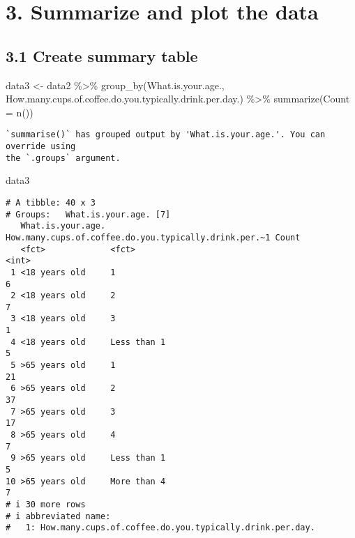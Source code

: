 \documentclass[
  letterpaper,
  DIV=11,
  numbers=noendperiod]{scrreprt}
\newenvironment{Shaded}{\begin{snugshade}}{\end{snugshade}}
\newcommand{\AttributeTok}[1]{\textcolor[rgb]{0.40,0.45,0.13}{#1}}
\newcommand{\FunctionTok}[1]{\textcolor[rgb]{0.28,0.35,0.67}{#1}}
\newcommand{\NormalTok}[1]{\textcolor[rgb]{0.00,0.23,0.31}{#1}}
\newcommand{\OtherTok}[1]{\textcolor[rgb]{0.00,0.23,0.31}{#1}}
\newcommand{\SpecialCharTok}[1]{\textcolor[rgb]{0.37,0.37,0.37}{#1}}
\begin{document}
\hypertarget{summarize-and-plot-the-data}{%
\chapter{3. Summarize and plot the
data}\label{summarize-and-plot-the-data}}

\hypertarget{create-summary-table}{%
\section{3.1 Create summary table}\label{create-summary-table}}

\begin{Shaded}
\begin{Highlighting}[]
\NormalTok{data3 }\OtherTok{\textless{}{-}}\NormalTok{ data2 }\SpecialCharTok{\%\textgreater{}\%} 
  \FunctionTok{group\_by}\NormalTok{(What.is.your.age., How.many.cups.of.coffee.do.you.typically.drink.per.day.) }\SpecialCharTok{\%\textgreater{}\%} 
  \FunctionTok{summarize}\NormalTok{(}\AttributeTok{Count =} \FunctionTok{n}\NormalTok{())}
\end{Highlighting}
\end{Shaded}

\begin{verbatim}
`summarise()` has grouped output by 'What.is.your.age.'. You can override using
the `.groups` argument.
\end{verbatim}

\begin{Shaded}
\begin{Highlighting}[]
\NormalTok{data3}
\end{Highlighting}
\end{Shaded}

\begin{verbatim}
# A tibble: 40 x 3
# Groups:   What.is.your.age. [7]
   What.is.your.age. How.many.cups.of.coffee.do.you.typically.drink.per.~1 Count
   <fct>             <fct>                                                 <int>
 1 <18 years old     1                                                         6
 2 <18 years old     2                                                         7
 3 <18 years old     3                                                         1
 4 <18 years old     Less than 1                                               5
 5 >65 years old     1                                                        21
 6 >65 years old     2                                                        37
 7 >65 years old     3                                                        17
 8 >65 years old     4                                                         7
 9 >65 years old     Less than 1                                               5
10 >65 years old     More than 4                                               7
# i 30 more rows
# i abbreviated name:
#   1: How.many.cups.of.coffee.do.you.typically.drink.per.day.
\end{verbatim}
\end{document}
